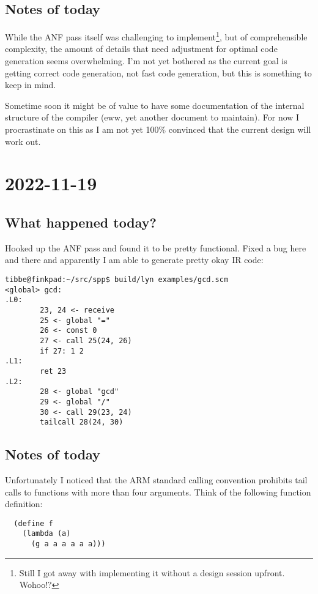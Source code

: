 \documentclass[12pt, article]{article}
\begin{document}
\subsection{Notes of today}

While the ANF pass itself was challenging to implement\footnote{Still
  I got away with implementing it without a design session
  upfront. Wohoo!?}, but of comprehensible complexity, the amount of
details that need adjustment for optimal code generation seems
overwhelming.
I'm not yet bothered as the current goal is getting correct code
generation, not fast code generation, but this is something to keep in
mind.


Sometime soon it might be of value to have some documentation of the
internal structure of the compiler (eww, yet another document to
maintain).
For now I procrastinate on this as I am not yet 100\% convinced that
the current design will work out.

\section{2022-11-19}

\subsection{What happened today?}

Hooked up the ANF pass and found it to be pretty functional.
Fixed a bug here and there and apparently I am able to generate pretty
okay IR code:

\begin{lstlisting}
tibbe@finkpad:~/src/spp$ build/lyn examples/gcd.scm
<global> gcd:
.L0:
        23, 24 <- receive
        25 <- global "="
        26 <- const 0
        27 <- call 25(24, 26)
        if 27: 1 2
.L1:
        ret 23
.L2:
        28 <- global "gcd"
        29 <- global "/"
        30 <- call 29(23, 24)
        tailcall 28(24, 30)
\end{lstlisting}

\subsection{Notes of today}

Unfortunately I noticed that the ARM standard calling convention
prohibits tail calls to functions with more than four arguments.
Think of the following function definition:

\begin{lstlisting}
  (define f
    (lambda (a)
      (g a a a a a a)))
\end{lstlisting}
\end{document}
